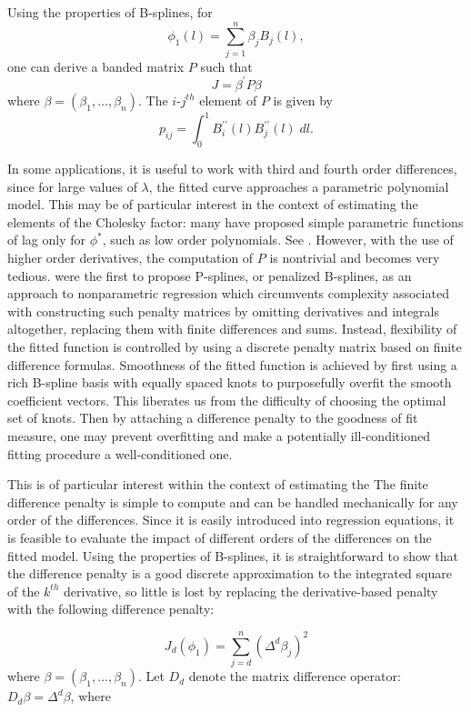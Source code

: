 \documentclass[12pt]{article}
\theoremstyle{definition}
\begin{document}
Using the properties of B-splines, for 
\[
\phi_1\left(l\right) = \sum\limits_{j=1}^n \beta_j B_j\left(l\right),
\]
one can derive a banded matrix $P$ such that 
 \[
 J = \beta^\prime P \beta
 \] 
 \noindent
 where $\beta = \left(\beta_1,\dots, \beta_n\right)$. The $i$-$j^{th}$ element of $P$ is given by
 \[
 p_{ij} = \int_0^1 B_i^{\prime \prime} \left( l \right)B_j^{\prime \prime} \left( l \right)\;dl.
 \]

In some applications, it is useful to work with third and fourth order differences, since for large values of $\lambda$, the fitted curve approaches a parametric polynomial model. This may be of particular interest in the context of estimating the elements of the Cholesky factor: many have proposed simple parametric functions of lag only for $\phi^*$, such as low order polynomials. See \citet{pourahmadi1999joint}. However, with the use of higher order derivatives, the computation of $P$ is nontrivial and becomes very tedious. \citet{eilers1996flexible} were the first to propose P-splines, or penalized B-splines, as an approach to nonparametric regression which circumvents complexity associated with constructing such penalty matrices by omitting derivatives and integrals altogether, replacing them with finite differences and sums. Instead, flexibility of the fitted function is controlled by using a discrete penalty matrix based on finite difference formulas. Smoothness of the fitted function is achieved by first using a rich B-spline basis with equally spaced knots to purposefully overfit the smooth coefficient vectors. This liberates us from the difficulty of choosing the optimal set of knots. Then by attaching a difference penalty to the goodness of fit measure, one may prevent overfitting and make a potentially ill-conditioned fitting procedure a well-conditioned one. 

This is of particular interest within the context of estimating the The finite difference penalty is simple to compute and can be handled mechanically for any order of the differences. Since it is easily introduced into regression equations, it is feasible to evaluate the impact of different orders of the differences on the fitted model.  Using the properties of B-splines, it is straightforward to show that the difference penalty is a good discrete approximation to the integrated square of the $k^{th}$ derivative, so little is lost by replacing the derivative-based penalty with the following difference penalty:

\begin{equation} \label{eq:bspline-difference-penalty}
J_d\left( \phi_1 \right) = \sum_{j=d}^n \left(\Delta^d \beta_j\right)^2
\end{equation} 
\noindent
where $\beta = \left( \beta_1,\dots,\beta_n \right)$. Let $D_d$ denote the matrix difference operator: $D_d\beta = \Delta^d \beta$, where
\end{document}
